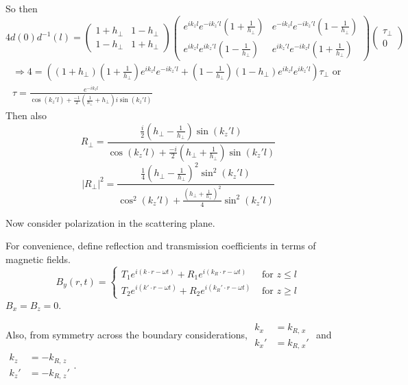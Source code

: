 \documentclass[twoside,10pt]{amsart}
\begin{document}
So then 
\[
4 d(0) d^{-1}(l) = \left( \begin{matrix} 1 + h_{\perp} & 1 - h_{\perp} \\ 1 - h_{\perp} & 1 + h_{\perp} \end{matrix} \right) \left( \begin{matrix} e^{ik_z l} e^{-ik_z' l} ( 1 + \frac{1}{h_{\perp}} ) & e^{-ik_zl }e^{-ik_z' l} (1 - \frac{1}{h_{\perp} } ) \\ e^{ik_z l}e^{ i k_z' l} (1 - \frac{1}{h_{\perp} }) & e^{ik_z'l} e^{-ik_z l} (1 + \frac{1}{h_{\perp} }) \end{matrix} \right) \left( \begin{matrix} \tau_{\perp} \\ 0 \end{matrix} \right)
\]
\[
\begin{gathered}
  \Longrightarrow 4 = ((1+h_{\perp} )(1 + \frac{1}{h_{\perp} } ) e^{i k_z l } e^{-ik_z' l} + ( 1 - \frac{1}{h_{\perp}} )( 1 -h_{\perp} ) e^{ik_z l} e^{ik_z' l} )\tau_{\perp} \text{ or } \\
  \tau = \frac{ e^{-i k_zl } }{ \cos{(k_z' l) } + \frac{-1}{2} (\frac{1}{h_{\perp}} + h_{\perp} ) i \sin{(k_z' l) } }
\end{gathered}
\]
Then also
\[
R_{\perp} =\frac{ \frac{i}{2} ( h_{\perp} - \frac{1}{h_{\perp} } ) \sin{(k_z' l) } }{ \cos{(k_z' l)} + \frac{-i}{2} (h_{\perp} + \frac{1}{h_{\perp}} )\sin{(k_z' l) }}
\]
\[
|R_{\perp}|^2 = \frac{ \frac{1}{4} ( h_{\perp} - \frac{1}{ h_{\perp}})^2 \sin^2{ (k_z' l) } }{ \cos^2{( k_z' l) } + \frac{ (h_{\perp} + \frac{1}{ h_{\perp} } )^2 }{ 4} \sin^2{ (k_z' l) } }
\]

Now consider polarization in the scattering plane.  

For convenience, define reflection and transmission coefficients in terms of magnetic fields.  
\[
B_y(r,t) = \begin{cases} T_1 e^{ i (k\cdot r - \omega t) } + R_1 e^{i (k_R \cdot r - \omega t)} & \text{ for } z \leq l \\ T_2 e^{i (k'\cdot r - \omega t)} + R_2 e^{i(k_R' \cdot r - \omega t) } & \text{ for } z \geq l \end{cases} 
\]
$B_x = B_z = 0$.  

Also, from symmetry across the boundary considerations, $\begin{aligned} k_x & = k_{R,\,x} \\ k_x' & = k_{R, \, x}' \end{aligned}$ and $\begin{aligned} k_z & = -k_{R, \, z} \\ k_z' & = - k_{R, \, z}' \end{aligned}$.
\end{document}
